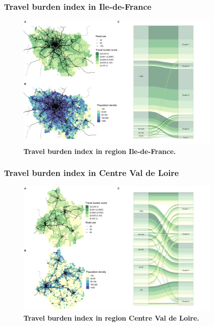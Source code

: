 \subsubsection{Travel burden index in Ile-de-France}

\begin{figure}[H]
    \includegraphics[width=0.9\textwidth]{images/routes/fig4_11.png}
    \centering
    \caption{
        \textbf{Travel burden index in region Ile-de-France.}
    }
    \label{fig:routes-burden-index-idf}
\end{figure}

\subsubsection{Travel burden index in Centre Val de Loire}

\begin{figure}[H]
    \includegraphics[width=0.9\textwidth]{images/routes/fig4_24.png}
    \centering
    \caption{
        \textbf{Travel burden index in region Centre Val de Loire.}
    }
    \label{fig:routes-burden-index-cvdl}
\end{figure}

